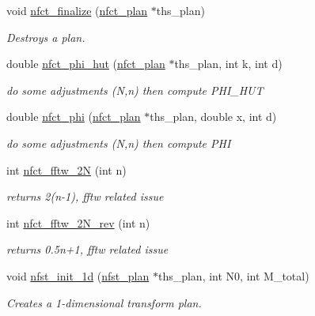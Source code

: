 \begin{CompactItemize}
void \hyperlink{group__nfsct_g5613906eb739a977bd862fbdb25224f6}{nfct\_\-finalize} (\hyperlink{structnfct__plan}{nfct\_\-plan} $\ast$ths\_\-plan)
\begin{CompactList}\small\item\em Destroys a plan. \item\end{CompactList}\item 
double \hyperlink{group__nfsct_g10982ac173900c44e0317a8fb01e53c1}{nfct\_\-phi\_\-hut} (\hyperlink{structnfct__plan}{nfct\_\-plan} $\ast$ths\_\-plan, int k, int d)
\begin{CompactList}\small\item\em do some adjustments (N,n) then compute PHI\_\-HUT \item\end{CompactList}\item 
double \hyperlink{group__nfsct_g825ccf26ddeddc330f320146d3d223de}{nfct\_\-phi} (\hyperlink{structnfct__plan}{nfct\_\-plan} $\ast$ths\_\-plan, double x, int d)
\begin{CompactList}\small\item\em do some adjustments (N,n) then compute PHI \item\end{CompactList}\item 
int \hyperlink{group__nfsct_gf8091eb47eeeae93a156ac83c98dc638}{nfct\_\-fftw\_\-2N} (int n)
\begin{CompactList}\small\item\em returns 2(n-1), fftw related issue \item\end{CompactList}\item 
int \hyperlink{group__nfsct_ge0f5cc8613123ec5bbab8c7b728255d1}{nfct\_\-fftw\_\-2N\_\-rev} (int n)
\begin{CompactList}\small\item\em returns 0.5n+1, fftw related issue \item\end{CompactList}\item 
void \hyperlink{group__nfsct_gc13a4c85f5cd43cfc3b5c3895021a9a9}{nfst\_\-init\_\-1d} (\hyperlink{structnfst__plan}{nfst\_\-plan} $\ast$ths\_\-plan, int N0, int M\_\-total)
\begin{CompactList}\small\item\em Creates a 1-dimensional transform plan. \item\end{CompactList}\item 

\end{CompactItemize}
